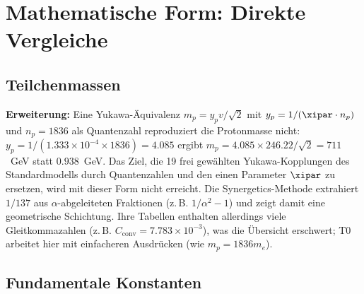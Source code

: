 	\section{Mathematische Form: Direkte Vergleiche}
	
	\subsection{Teilchenmassen}
	
	\begin{center}
	\end{center}
	
	
	
	\textbf{Erweiterung:} Eine Yukawa-Äquivalenz $m_p = y_p v / \sqrt{2}$ mit $y_p = 1 / (\xipar \cdot n_p)$ und $n_p = 1836$ als Quantenzahl reproduziert die Protonmasse nicht: $y_p = 1/(1.333\times10^{-4}\times1836) = 4.085$ ergibt $m_p = 4.085\times246.22/\sqrt2 = 711$~GeV statt $0.938$~GeV. Das Ziel, die 19 frei gewählten Yukawa-Kopplungen des Standardmodells durch Quantenzahlen und den einen Parameter $\xipar$ zu ersetzen, wird mit dieser Form nicht erreicht. Die Synergetics-Methode extrahiert $1/137$ aus $\alpha$-abgeleiteten Fraktionen (z.\,B. $1/\alpha^2 - 1$) und zeigt damit eine geometrische Schichtung. Ihre Tabellen enthalten allerdings viele Gleitkommazahlen (z.\,B. $C_{\text{conv}} = 7.783 \times 10^{-3}$), was die Übersicht erschwert; T0 arbeitet hier mit einfacheren Ausdrücken (wie $m_p = 1836 m_e$).
	
	\subsection{Fundamentale Konstanten}
	
